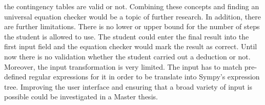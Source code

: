     the contingency tables are valid or not. Combining these concepts and finding an universal equation checker would be a topic of further research. In addition, there are further limitations. There is no lower or upper bound for the
    number of steps the student is allowed to use. The student could enter the final result into the first input field and the equation checker would mark the result as correct. Until now there is no validation whether the student carried out a deduction or not. Moreover,
    the input transformation is very limited. The input has to match pre-defined regular expressions for it in order to be translate into Sympy's expression tree. Improving the user interface and ensuring that a broad variety of input is possible could be investigated
    in a Master thesis.

